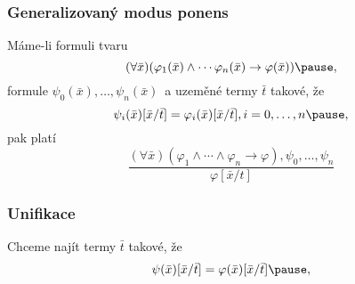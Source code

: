 \documentclass[red,professionalfont]{beamer}
\theoremstyle{definition}
\newcommand{\0}{\mbox{${\bf 0}$}}
\begin{document}
\begin{frame}\frametitle{Generalizovaný modus ponens}
Máme-li formuli tvaru\pause
\begin{displaymath}
 (\forall\bar{x})(\varphi_1(\bar{x})\wedge\cdots\varphi_n(\bar{x})\rightarrow\varphi(\bar{x}))\pause,
\end{displaymath}
formule $\psi_0(\bar{x}),\ldots,\psi_n(\bar{x})$\pause\ a uzeměné termy $\bar{t}$ takové, že\pause
\begin{displaymath}
   \psi_i(\bar{x})[\bar{x}/\bar{t}] = \varphi_i(\bar{x})[\bar{x}/\bar{t}],\medskip i=0,\ldots,n\pause,
\end{displaymath}
pak platí
\begin{displaymath}
 \frac{(\forall \bar{x})(\varphi_1\wedge\cdots\wedge\varphi_n\rightarrow\varphi),
       \psi_0,\ldots,\psi_n}
      {\varphi[\bar{x}/t]}
\end{displaymath}
\end{frame}
\begin{frame}\frametitle{Unifikace}
 \begin{center}
  Chceme najít termy $\bar{t}$ takové, že\pause
  \begin{displaymath}
   \psi(\bar{x})[\bar{x}/\bar{t}] = \varphi(\bar{x})[\bar{x}/\bar{t}]\pause,
\end{displaymath}
 \end{center}
\end{frame}
\end{document}
